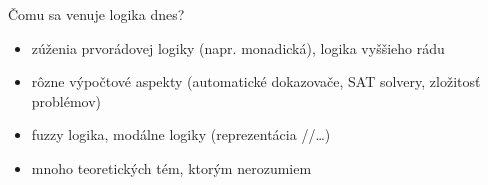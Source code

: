 \documentclass[12pt]{beamer}
\theoremstyle{definition}
\begin{document}
\begin{frame}{Čomu sa venuje logika dnes?}
\begin{itemize}
\item zúženia prvorádovej logiky (napr. monadická), logika vyššieho rádu
\item rôzne výpočtové aspekty (automatické dokazovače, SAT solvery, zložitosť problémov)
\item fuzzy logika, modálne logiky (reprezentácia //\dots)
\item mnoho teoretických tém, ktorým nerozumiem
\end{itemize}
\end{frame}
\end{document}
